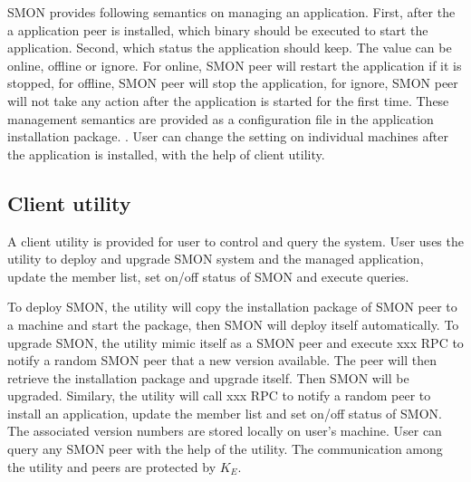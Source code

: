 

SMON provides following semantics on managing an
application. First, after the a application peer is
installed, which binary should be executed to start the
application. Second, which status the application should
keep. The value can be online, offline or ignore. For
online, SMON peer will restart the application if it is
stopped, for offline, SMON peer will stop the application,
for ignore, SMON peer will not take any action after the
application is started for the first time. These management
semantics are provided as a configuration file in the
application installation package. . User can change the setting on individual machines
after the application is installed, with the help of client
utility.

\subsection{Client utility}
\label{subsec:client}

A client utility is provided for user to control and query
the system. User uses the utility to deploy and upgrade
SMON system and the managed application, update the member
list, set on/off status of SMON and execute queries.

To deploy SMON, the utility will copy the installation
package of SMON peer to a machine and start the package,
then SMON will deploy itself automatically. To upgrade SMON,
the utility mimic itself as a SMON peer and execute xxx RPC
to notify a random SMON peer that a new version available.
The peer will then retrieve the installation package and
upgrade itself. Then SMON will be upgraded. Similary, the
utility will call xxx RPC to notify a random peer to install
an application, update the member list and set on/off status
of SMON. The associated version numbers are stored locally
on user's machine. User can query any SMON peer with the
help of the utility. The communication among the utility and
peers are protected by $K_E$.

